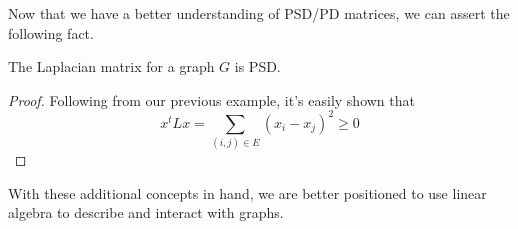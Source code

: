 \documentclass{article}
\begin{document}
    Now that we have a better understanding of PSD/PD matrices, we can assert the following fact.
    \begin{theorem}
        The Laplacian matrix for a graph $G$ is PSD.
    \end{theorem}
    \begin{proof}
        Following from our previous example, it's easily shown that
        $$x^{t}Lx = \sum_{(i,j)\in E}(x_i - x_j)^2 \geq 0$$
    \end{proof}
    
    With these additional concepts in hand, we are better positioned to use linear algebra to describe and interact with graphs.
\end{document}
